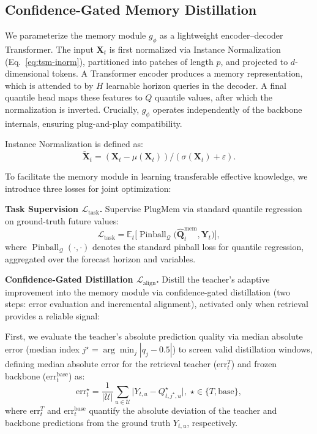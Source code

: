\subsection{Confidence-Gated Memory Distillation}
\label{sec:plugmem}

We parameterize the memory module $g_{\phi}$ as a lightweight encoder--decoder Transformer. The input $\mathbf{X}_t$ is first normalized via Instance Normalization (Eq.~\ref{eq:tsm-inorm}), partitioned into patches of length $p$, and projected to $d$-dimensional tokens. A Transformer encoder produces a memory representation, which is attended to by $H$ learnable horizon queries in the decoder. A final quantile head maps these features to $Q$ quantile values, after which the normalization is inverted. Crucially, $g_{\phi}$ operates independently of the backbone internals, ensuring plug-and-play compatibility. 

Instance Normalization is defined as:
\begin{equation}
\widetilde{\mathbf{X}}_t = (\mathbf{X}_t - \mu(\mathbf{X}_t)) / (\sigma(\mathbf{X}_t) + \varepsilon).
\label{eq:tsm-inorm}
\end{equation}

To facilitate the memory module in learning transferable effective knowledge, we introduce three losses for joint optimization:

\noindent\textbf{Task Supervision $\mathcal{L}_{\text{task}}$.} Supervise PlugMem via standard quantile regression on ground-truth future values:
\begin{equation}
\mathcal{L}_{\text{task}} = \mathbb{E}_{t}\Big[
\operatorname{Pinball}_{\mathcal{Q}}\!\big(
\widehat{\mathbf{Q}}^{\text{mem}}_t,\mathbf{Y}_t
\big) \Big],
\label{eq:task-pinball-abstract}
\end{equation}
where $\operatorname{Pinball}_{\mathcal{Q}}(\cdot,\cdot)$ denotes the standard pinball loss for quantile regression, aggregated over the forecast horizon and variables.

\noindent\textbf{Confidence-Gated Distillation $\mathcal{L}_{\text{align}}$.} Distill the teacher's adaptive improvement into the memory module via confidence-gated distillation (two steps: error evaluation and incremental alignment), activated only when retrieval provides a reliable signal:

First, we evaluate the teacher's absolute prediction quality via median absolute error (median index $j^\star=\arg\min_j |q_j-0.5|$) to screen valid distillation windows, defining median absolute error for the retrieval teacher ($\mathrm{err}_t^T$) and frozen backbone ($\mathrm{err}_t^\mathrm{base}$) as:
\begin{equation}
\mathrm{err}_t^\star=\frac{1}{|\mathcal{U}|}\sum_{u\in\mathcal{U}}\bigl|Y_{t,u}-Q_{t,j^\star,u}^\star\bigr|,\;\star\in\{T,\mathrm{base}\},
\label{equ:err}
\end{equation}
where $\mathrm{err}_t^T$ and $\mathrm{err}_t^\mathrm{base}$ quantify the absolute deviation of the teacher and backbone predictions from the ground truth $Y_{t,u}$, respectively.

